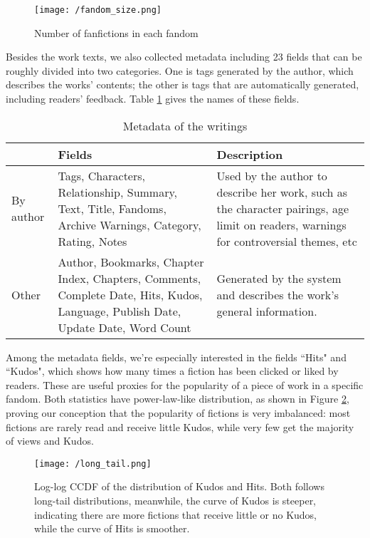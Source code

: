 \documentclass[11pt]{article} %
\begin{document}
\begin{figure}[htbp]
\begin{center}
\texttt{[image: /fandom\_size.png]}
\caption{Number of fanfictions in each fandom}
\label{fig:fandom_size}
\end{center}
\end{figure}


Besides the work texts, we also collected metadata including 23 fields that can be roughly divided into two categories. One is tags generated by the author, which describes the works' contents; the other is tags that are automatically generated, including readers' feedback. Table \ref{tab:metadata} gives the names of these fields. 

\begin{table}[htp]
\caption{Metadata of the writings}
\begin{center}
\begin{tabular}[width=0.8\textwidth]{p{2cm}|p{3cm}|p{5cm}}
  \hline			
 & Fields & Description\\ 
   \hline			
By author & Tags, Characters, Relationship, Summary, Text, Title, 
Fandoms,  Archive Warnings, Category, Rating, Notes &
Used by the author to describe her work, such as the character pairings, age limit on 
readers, warnings for controversial themes, etc
\\
\hline
 Other & Author, Bookmarks, Chapter Index, Chapters, Comments, Complete Date, 
 Hits, Kudos, Language, Publish Date, Update Date, Word Count
 & Generated by the system and describes the work's general information. \\
\hline
\end{tabular}
\end{center}
\label{tab:metadata}
\end{table}%

Among the metadata fields, we're especially interested in the fields ``Hits" and ``Kudos", which shows how many times a fiction has been clicked or liked by readers. These are useful proxies for the popularity of a piece of work in a specific fandom.
Both statistics have power-law-like distribution, as shown in  Figure \ref{fig:long_tail}, proving our conception that the popularity of fictions is very imbalanced: most fictions are rarely read and receive little Kudos, while very few get the majority of views and Kudos.

\begin{figure}[htbp]
\begin{center}
\texttt{[image: /long\_tail.png]}
\caption{Log-log CCDF of the distribution of Kudos and Hits. Both follows long-tail distributions, meanwhile, the curve of 
Kudos is steeper, indicating there are more fictions that receive little or no Kudos, while the curve of Hits is smoother. }
\label{fig:long_tail}
\end{center}
\end{figure}
\end{document}
